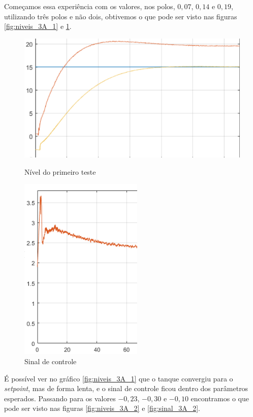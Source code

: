\documentclass[
	12pt,				%
	openany,			%
	oneside,			%
	a4paper,			%
	english,			%
	french,				%
	spanish,			%
	brazil,				%
	]{abntex2}
\begin{document}
{Começamos essa experiência com os valores, nos polos, $0,07$, $0,14$ e $0,19$, utilizando três polos e não dois, obtivemos o que pode ser visto nas figuras \ref{fig:niveis_3A_1} e \ref{fig:sinal_3A_1}.

\begin{figure}[h]
	\centering
	\begin{minipage}{.5\textwidth}
		\centering
		\includegraphics[scale=0.45]{imagens/3A_1_niveis.png}
		\caption{Nível do primeiro teste}
		\label{fig:niveis_3A_1}		
	\end{minipage}%
	\begin{minipage}{.5\textwidth}
		\centering
		\includegraphics[scale=0.45]{imagens/3A_1_sinal_controle.png}
		\caption{Sinal de controle}
		\label{fig:sinal_3A_1}		
	\end{minipage}
\end{figure}

É possível ver no gráfico \ref{fig:niveis_3A_1} que o tanque convergiu para o \textit{setpoint}, mas de forma lenta, e o sinal de controle ficou dentro dos parâmetros esperados. Passando para os valores $-0,23$, $-0,30$ e $-0,10$ encontramos o que pode ser visto nas figuras \ref{fig:niveis_3A_2} e \ref{fig:sinal_3A_2}.

}
\end{document}
